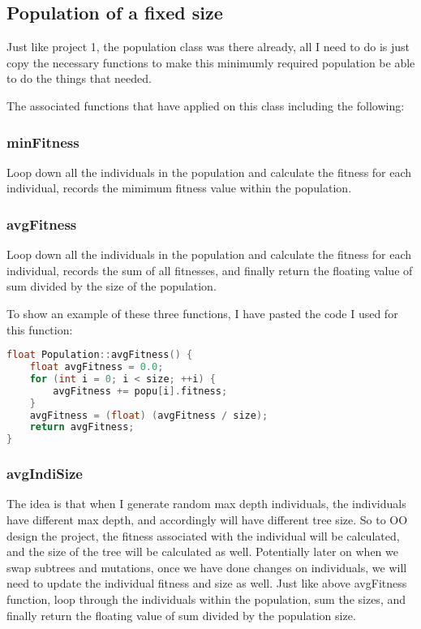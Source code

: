 \documentclass[10pt,b5paper]{article}
\begin{document}
\subsection{Population of a fixed size}
\label{sec-2-8}
Just like project 1, the population class was there already, all I need to do is just copy the necessary functions to make this minimumly required population be able to do the things that needed. 

The associated functions that have applied on this class including the following: 
\subsubsection{minFitness}
\label{sec-2-8-1}
Loop down all the individuals in the population and calculate the fitness for each individual, records the mimimum fitness value within the population.

\subsubsection{avgFitness}
\label{sec-2-8-2}
Loop down all the individuals in the population and calculate the fitness for each individual, records the sum of all fitnesses, and finally return the floating value of sum divided by the size of the population.

To show an example of these three functions, I have pasted the code I used for this function: 
\begin{lstlisting}[language=c++]
float Population::avgFitness() {
    float avgFitness = 0.0;
    for (int i = 0; i < size; ++i) {
        avgFitness += popu[i].fitness;
    }
    avgFitness = (float) (avgFitness / size);
    return avgFitness;
}
\end{lstlisting}

\subsubsection{avgIndiSize}
\label{sec-2-8-3}
The idea is that when I generate random max depth individuals, the individuals have different max depth, and accordingly will have different tree size. So to OO design the project, the fitness associated with the individual will be calculated, and the size of the tree will be calculated as well. Potentially later on when we swap subtrees and mutations, once we have done changes on individuals, we will need to update the individual fitness and size as well. 
Just like above avgFitness function, loop through the individuals within the population, sum the sizes, and finally return the floating value of sum divided by the population size. 
\end{document}

